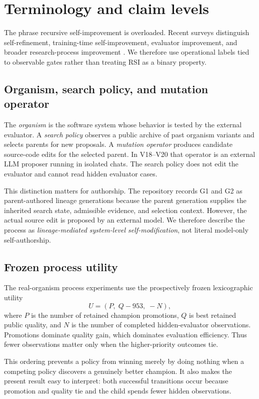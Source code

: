 \section{Terminology and claim levels}

The phrase recursive self-improvement is overloaded. Recent surveys distinguish self-refinement, training-time self-improvement, evaluator improvement, and broader research-process improvement \cite{chen2026rsisurvey}. We therefore use operational labels tied to observable gates rather than treating RSI as a binary property.

\subsection{Organism, search policy, and mutation operator}

The \emph{organism} is the software system whose behavior is tested by the external evaluator. A \emph{search policy} observes a public archive of past organism variants and selects parents for new proposals. A \emph{mutation operator} produces candidate source-code edits for the selected parent. In V18--V20 that operator is an external LLM proposer running in isolated chats. The search policy does not edit the evaluator and cannot read hidden evaluator cases.

This distinction matters for authorship. The repository records G1 and G2 as parent-authored lineage generations because the parent generation supplies the inherited search state, admissible evidence, and selection context. However, the actual source edit is proposed by an external model. We therefore describe the process as \emph{lineage-mediated system-level self-modification}, not literal model-only self-authorship.

\subsection{Frozen process utility}

The real-organism process experiments use the prospectively frozen lexicographic utility
\[
U = \left(P,\; Q-953,\; -N\right),
\]
where $P$ is the number of retained champion promotions, $Q$ is best retained public quality, and $N$ is the number of completed hidden-evaluator observations. Promotions dominate quality gain, which dominates evaluation efficiency. Thus fewer observations matter only when the higher-priority outcomes tie.

This ordering prevents a policy from winning merely by doing nothing when a competing policy discovers a genuinely better champion. It also makes the present result easy to interpret: both successful transitions occur because promotion and quality tie and the child spends fewer hidden observations.

